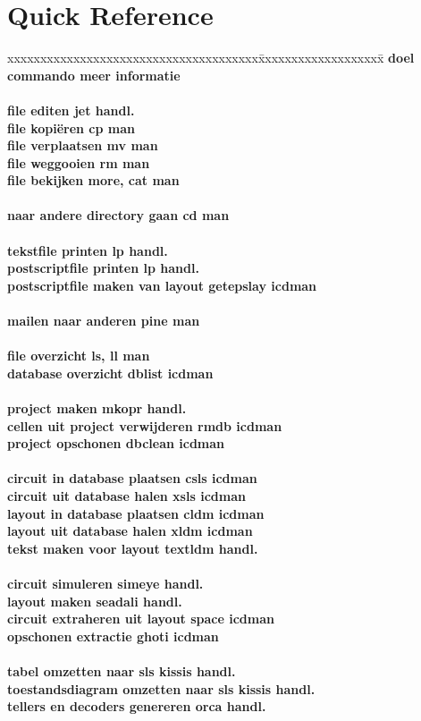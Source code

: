 \section {Quick Reference}


\begin{tabbing}
xxxxxxxxxxxxxxxxxxxxxxxxxxxxxxxxxxxxxx\=xxxxxxxxxxxxxxxxxxx\=\kill
\bf{doel}  	\>\bf{commando}	\>\bf{meer informatie} \\
\\
file editen			\>jet		\>handl.\\
file kopi\"{e}ren		\>cp		\>man\\
file verplaatsen		\>mv		\>man\\
file weggooien			\>rm		\>man\\
file bekijken			\>more, cat	\>man\\
\\
naar andere directory gaan	\>cd		\>man\\
\\
tekstfile printen		\>lp 		\>handl.\\
postscriptfile printen		\>lp  		\>handl.\\
postscriptfile maken van layout	\>getepslay	\>icdman\\
\\
mailen naar anderen		\>pine  	\>man\\
\\
file overzicht			\>ls, ll	\>man\\
database overzicht		\>dblist	\>icdman\\
\\
project maken			\>mkopr		\>handl.\\
cellen uit project verwijderen	\>rmdb		\>icdman \\
project opschonen		\>dbclean	\>icdman \\
\\
circuit in database plaatsen	\>csls	 	\>icdman\\
circuit uit database halen	\>xsls		\>icdman\\
layout in database plaatsen	\>cldm 		\>icdman \\
layout uit database halen	\>xldm		\>icdman \\
tekst maken voor layout		\>textldm	\>handl. \\
\\
circuit simuleren		\>simeye	\>handl.\\
layout maken			\>seadali 	\>handl.\\
circuit extraheren uit layout	\>space  	\>icdman\\
opschonen extractie		\>ghoti		\>icdman\\
\\
tabel omzetten naar sls		\>kissis	\>handl.\\
toestandsdiagram omzetten naar sls \>kissis	\>handl.\\
tellers en decoders genereren	\>orca		\>handl.\\
\end{tabbing}

\cleardoublepage










